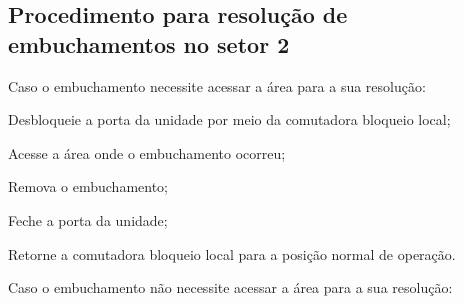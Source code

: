 
\ifmachineTypeFlexo

\subsection{Procedimento para resolução de embuchamentos no setor 2}

\begin{procedureFixingIsuesSector2}

  \item[\ding{\dingNumber}] Caso o embuchamento necessite acessar a área para a sua resolução:
  

  \begin{procedureFixingIsuesSector2.1}
  
    \item[\ding{\dingNumber}] Desbloqueie a porta da unidade por meio da comutadora bloqueio local;
    \item[\ding{\dingNumber}] Acesse a área onde o embuchamento ocorreu;
    \item[\ding{\dingNumber}] Remova o embuchamento;
    \item[\ding{\dingNumber}] Feche a porta da unidade;
    \item[\ding{\dingNumber}] Retorne a comutadora bloqueio local para a posição normal de operação.
    
  \end{procedureFixingIsuesSector2.1}

  \item[\ding{\dingNumber}] Caso o embuchamento não necessite acessar a área para a sua resolução:
  

  \begin{procedureFixingIsuesSector2.2}
  

\end{procedureFixingIsuesSector2.2}
\end{procedureFixingIsuesSector2}
